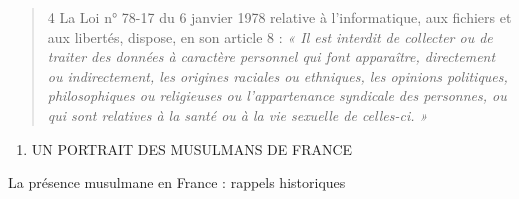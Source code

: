 \begin{quote}
4 La Loi n° 78-17 du 6 janvier 1978 relative à l'informatique, aux
fichiers et aux libertés, dispose, en son article 8 : \emph{« Il est
interdit de collecter ou de traiter des données à caractère personnel
qui font apparaître, directement ou indirectement, les origines raciales
ou ethniques, les opinions politiques, philosophiques ou religieuses ou
l'appartenance syndicale des personnes, ou qui sont relatives à la santé
ou à la vie sexuelle de celles-ci. »}
\end{quote}

\begin{enumerate}
\def\labelenumi{\Roman{enumi}.}
\item
  UN PORTRAIT DES MUSULMANS DE FRANCE
\end{enumerate}

La présence musulmane en France : rappels historiques

